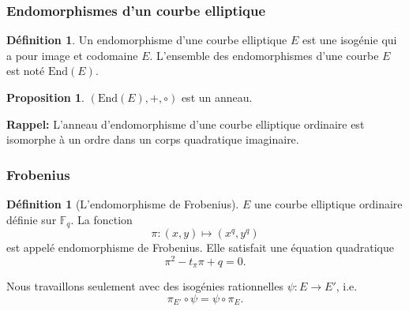 \documentclass[10pt,a4paper]{beamer}
\theoremstyle{plain}
\theoremstyle{definition}
\theoremstyle{definition}
\theoremstyle{definition}
\newtheorem{prop}[thm]{Proposition}
\theoremstyle{definition}
\newtheorem{defi}[thm]{Définition}
\theoremstyle{remark}
\theoremstyle{remark}
\begin{document}
\begin{frame}

\end{frame}

\begin{frame}
\frametitle{Endomorphismes d'un courbe elliptique}
\begin{defi}
Un endomorphisme d'une courbe elliptique $E$ est une isogénie qui a pour image 
et codomaine $E$. L'ensemble des endomorphismes d'une courbe $E$ est noté $\mathrm{End}(E)$.
\end{defi}

\begin{prop}
$\left( \mathrm{End}(E),+,\circ \right)$ est un anneau.
\end{prop}
\textbf{Rappel:} L'anneau d'endomorphisme d'une courbe elliptique ordinaire est isomorphe à un ordre dans un corps quadratique imaginaire.
\end{frame}


\begin{frame}
\frametitle{Frobenius}
\begin{defi}[L'endomorphisme de Frobenius]
$E$ une courbe elliptique ordinaire définie sur $\mathbb{F}_q$. La fonction
\[ \pi:(x,y) \mapsto (x^q,y^q)\] est appelé endomorphisme de Frobenius. Elle
satisfait une équation quadratique \[ \pi^2 - t_\pi \pi + q = 0.\]
\end{defi}

Nous travaillons seulement avec des isogénies rationnelles $\psi:E \to E'$, i.e.
\[
\pi_{E'} \circ \psi =\psi \circ \pi_{E}.
 \]
 
\end{frame}

%
%
%
\end{document}
